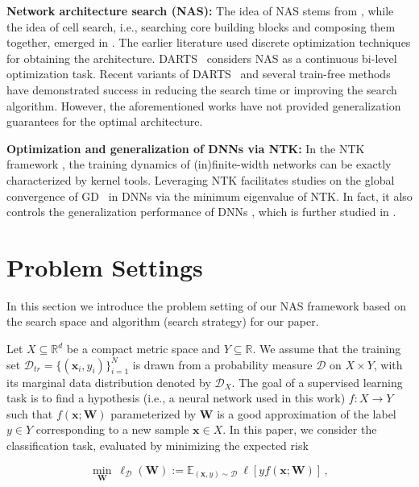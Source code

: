\documentclass[nohyperref]{article}
\theoremstyle{plain}
\theoremstyle{definition}
\theoremstyle{remark}
\begin{document}
{\bf Network architecture search (NAS):} The idea of NAS stems from \citet{45826}, while the idea of cell search, i.e., searching core building blocks and composing them together, emerged in \citet{zoph2018learning}. The earlier literature used discrete optimization techniques for obtaining the architecture. DARTS~\citep{liu2019darts} considers NAS as a continuous bi-level optimization task. Recent variants of DARTS~\citep{xu2019pc, wu2019fbnet} and several train-free methods~\citep{mellor2021neural, chen2021neural, pmlr-v139-xu21m} have demonstrated success in reducing the search time or improving the search algorithm. However, the aforementioned works have not provided generalization guarantees for the optimal architecture. 


{\bf Optimization and generalization of DNNs via NTK:} In the NTK framework \citep{jacot2018neural,du2019gradient,chen2020much}, the training dynamics of (in)finite-width networks can be exactly characterized by kernel tools. Leveraging NTK facilitates studies on the global convergence of GD~\cite{pmlr-v97-allen-zhu19a, du2019gradient, nguyen2021proof} in DNNs via the minimum eigenvalue of NTK. In fact, it also controls the generalization performance of DNNs \citep{du2018gradient,cao2019generalization,allen2018learning}, which is further studied in \citet{bachspaper}. \section{Problem Settings}
\label{sec:preliminaries}
In this section we introduce the problem setting of our NAS framework based on the search space and algorithm (search strategy) for our paper.


Let $X \subseteq \mathbb{R}^d$ be a compact metric space and $Y \subseteq \mathbb{R}$. We assume that the training set $\mathcal{D}_{tr} = \{  (\bm x_i, y_i) \}_{i=1}^N $ is drawn from a probability measure $\mathcal{D}$ on $X \times Y$, with its marginal data distribution denoted by $\mathcal{D}_X$.
The goal of a supervised learning task is to find a hypothesis (i.e., a neural network used in this work) $f: X \rightarrow Y$ such that $f(\bm x; \bm W)$ parameterized by $\bm W$
is a good approximation of the label $y \in Y$ corresponding to a new sample $\bm x \in X$.
In this paper, we consider the classification task, evaluated by minimizing the expected risk 

\begin{equation*}
\min_{\bm{W}}~\ell_{\mathcal{D} }(\bm{W}):= \mathbb{E}_{(\bm {x},y)\sim \mathcal{D}}~ \ell [y f(\bm {x};\bm W)]\,,
\end{equation*}
\end{document}
